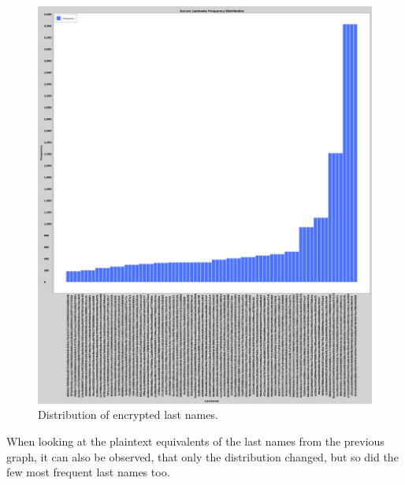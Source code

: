 \begin{figure}[h!]
    \centering
    \includegraphics[width=\textwidth]{03-ex2/Secure_Lastname_Frequency_Distribution.png}
    \caption{Distribution of encrypted last names.}
    \label{fig:Distribution-of-last-names-sec}
\end{figure}

When looking at the plaintext equivalents of the last names from the previous graph, it can also be observed, that only the distribution changed, but so did the few most frequent last names too.

